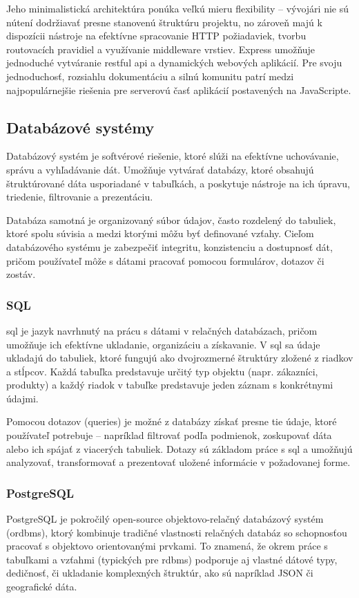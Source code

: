 Jeho minimalistická architektúra ponúka veľkú mieru flexibility – vývojári nie sú nútení dodržiavať presne stanovenú štruktúru projektu, no zároveň majú k dispozícii nástroje na efektívne spracovanie HTTP požiadaviek, tvorbu routovacích pravidiel a využívanie middleware vrstiev. Express umožňuje jednoduché vytváranie \acrshort{rest}ful \acrshort{api} a dynamických webových aplikácií. Pre svoju jednoduchosť, rozsiahlu dokumentáciu a silnú komunitu patrí medzi najpopulárnejšie riešenia pre serverovú časť aplikácií postavených na JavaScripte.\cite{express}\cite{backendframework}
\subsection{Databázové systémy}
Databázový systém je softvérové riešenie, ktoré slúži na efektívne uchovávanie, správu a vyhľadávanie dát. 
Umožňuje vytvárať databázy, ktoré obsahujú štruktúrované dáta usporiadané v tabuľkách, a poskytuje nástroje na ich úpravu, triedenie, filtrovanie a prezentáciu.

Databáza samotná je organizovaný súbor údajov, často rozdelený do tabuliek, ktoré spolu súvisia a medzi ktorými môžu byť definované vzťahy. 
Cieľom databázového systému je zabezpečiť integritu, konzistenciu a dostupnosť dát, pričom používateľ môže s dátami pracovať pomocou formulárov, dotazov či zostáv.\cite{databazovesystemy}

\subsubsection{SQL}
 \acrfull{sql} je jazyk navrhnutý na prácu s dátami v relačných databázach, pričom umožňuje ich efektívne ukladanie, organizáciu a získavanie.
  V \acrshort{sql} sa údaje ukladajú do tabuliek, ktoré fungujú ako dvojrozmerné štruktúry zložené z riadkov a stĺpcov. 
  Každá tabuľka predstavuje určitý typ objektu (napr. zákazníci, produkty) a každý riadok v tabuľke predstavuje jeden záznam s konkrétnymi údajmi.

Pomocou dotazov (queries) je možné z databázy získať presne tie údaje, ktoré používateľ potrebuje – napríklad filtrovať podľa podmienok, zoskupovať dáta alebo ich spájať z viacerých tabuliek.
 Dotazy sú základom práce s \acrshort{sql} a umožňujú analyzovať, transformovať a prezentovať uložené informácie v požadovanej forme.\cite{sql}

\subsubsection{PostgreSQL}
PostgreSQL je pokročilý open-source objektovo-relačný databázový systém (\acrshort{ordbms}), ktorý kombinuje tradičné vlastnosti relačných databáz so schopnosťou pracovať s objektovo orientovanými prvkami. 
To znamená, že okrem práce s tabuľkami a vzťahmi (typických pre \acrfull{rdbms}) podporuje aj vlastné dátové typy, dedičnosť, či ukladanie komplexných štruktúr, ako sú napríklad JSON či geografické dáta.

